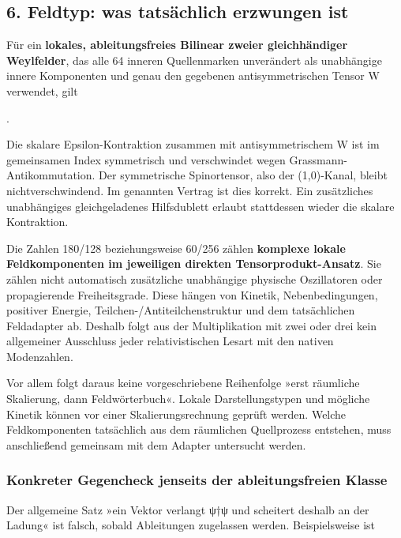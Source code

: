 \subsection{6. Feldtyp: was tatsächlich erzwungen
ist}\label{feldtyp-was-tatsuxe4chlich-erzwungen-ist}

Für ein \textbf{lokales, ableitungsfreies Bilinear zweier gleichhändiger
Weylfelder}, das alle 64 inneren Quellenmarken unverändert als
unabhängige innere Komponenten und genau den gegebenen antisymmetrischen
Tensor W verwendet, gilt

.

Die skalare Epsilon-Kontraktion zusammen mit antisymmetrischem W ist im
gemeinsamen Index symmetrisch und verschwindet wegen
Grassmann-Antikommutation. Der symmetrische Spinortensor, also der
(1,0)-Kanal, bleibt nichtverschwindend. Im genannten Vertrag ist dies
korrekt. Ein zusätzliches unabhängiges gleichgeladenes Hilfsdublett
erlaubt stattdessen wieder die skalare Kontraktion.

Die Zahlen 180/128 beziehungsweise 60/256 zählen \textbf{komplexe lokale
Feldkomponenten im jeweiligen direkten Tensorprodukt-Ansatz}. Sie zählen
nicht automatisch zusätzliche unabhängige physische Oszillatoren oder
propagierende Freiheitsgrade. Diese hängen von Kinetik,
Nebenbedingungen, positiver Energie, Teilchen-/Antiteilchenstruktur und
dem tatsächlichen Feldadapter ab. Deshalb folgt aus der Multiplikation
mit zwei oder drei kein allgemeiner Ausschluss jeder relativistischen
Lesart mit den nativen Modenzahlen.

Vor allem folgt daraus keine vorgeschriebene Reihenfolge »erst räumliche
Skalierung, dann Feldwörterbuch«. Lokale Darstellungstypen und mögliche
Kinetik können vor einer Skalierungsrechnung geprüft werden. Welche
Feldkomponenten tatsächlich aus dem räumlichen Quellprozess entstehen,
muss anschließend gemeinsam mit dem Adapter untersucht werden.

\subsubsection{Konkreter Gegencheck jenseits der ableitungsfreien
Klasse}\label{konkreter-gegencheck-jenseits-der-ableitungsfreien-klasse}

Der allgemeine Satz »ein Vektor verlangt ψ†ψ und scheitert deshalb an
der Ladung« ist falsch, sobald Ableitungen zugelassen werden.
Beispielsweise ist



